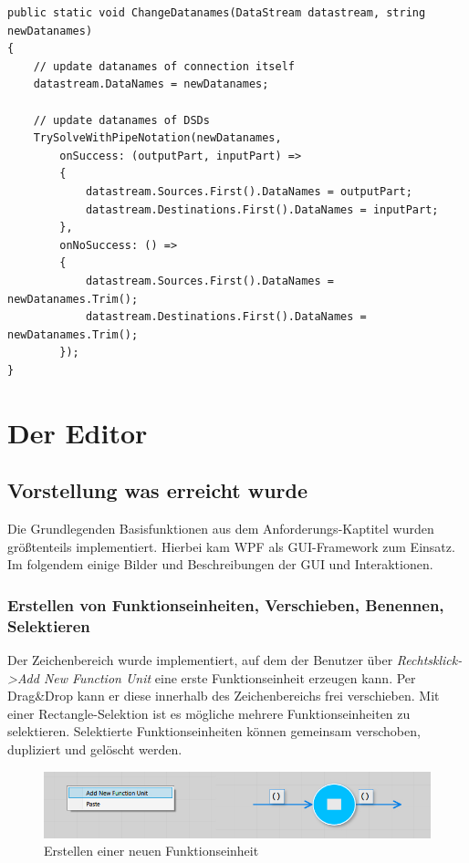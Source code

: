 \begin{enumerate}
	\begin{lstlisting}[caption=ChangeDatanames Methode]
public static void ChangeDatanames(DataStream datastream, string newDatanames)
{
	// update datanames of connection itself
	datastream.DataNames = newDatanames;
	
	// update datanames of DSDs
	TrySolveWithPipeNotation(newDatanames,
		onSuccess: (outputPart, inputPart) =>
		{
			datastream.Sources.First().DataNames = outputPart;
			datastream.Destinations.First().DataNames = inputPart;
		},
		onNoSuccess: () =>
		{
			datastream.Sources.First().DataNames = newDatanames.Trim();
			datastream.Destinations.First().DataNames = newDatanames.Trim();
		});
}
\end{lstlisting}
	
\end{enumerate}



\section{Der Editor}

\subsection{Vorstellung was erreicht wurde}

Die Grundlegenden Basisfunktionen aus dem Anforderungs-Kaptitel wurden größtenteils implementiert. Hierbei kam WPF als GUI-Framework zum Einsatz.
Im folgendem einige Bilder und Beschreibungen der GUI und Interaktionen.


\subsubsection{Erstellen von Funktionseinheiten, Verschieben, Benennen, Selektieren}

	Der Zeichenbereich wurde implementiert, auf dem der Benutzer über 
\textit{Rechtsklick->Add New Function Unit} eine erste Funktionseinheit erzeugen
	kann. Per Drag\&Drop kann er diese innerhalb des Zeichenbereichs frei
	verschieben. Mit einer Rectangle-Selektion ist es mögliche mehrere
	Funktionseinheiten zu selektieren. Selektierte Funktionseinheiten können
	gemeinsam verschoben, dupliziert und gelöscht werden.
	
		\begin{figure}[H]
			\centering
			\includegraphics[width=1\linewidth]{./img/newFunctionUnit.jpg} 
			\caption{Erstellen einer neuen Funktionseinheit}
		\end{figure}
		
